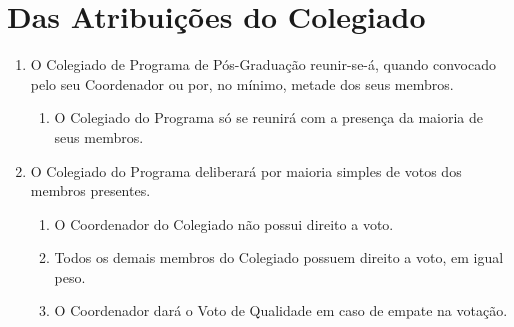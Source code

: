 \documentclass{article}
\newcommand{\singleitem}{\item[Parágrafo Único.]}
\begin{document}
\section{Das Atribuições do Colegiado}
\begin{enumerate}

	\item O Colegiado de Programa de Pós-Graduação reunir-se-á, quando convocado pelo seu Coordenador ou por, no mínimo, metade dos seus membros.
	\begin{enumerate}
		\singleitem O Colegiado do Programa só se reunirá com a presença da maioria de seus membros. 
	\end{enumerate}

	\item O Colegiado do Programa deliberará por maioria simples de votos dos membros presentes.
	\begin{enumerate}
		\item O Coordenador do Colegiado não possui direito a voto. 
		\item Todos os demais membros do Colegiado possuem direito a voto, em igual peso.
		\item O Coordenador dará o Voto de Qualidade em caso de empate na votação. %
	\end{enumerate}



\end{enumerate}
\end{document}
